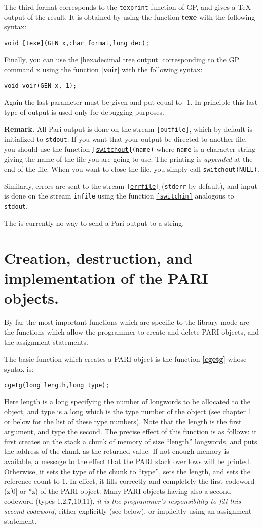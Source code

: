 The third format corresponds to the {\tt texprint} function of GP, and gives
a \TeX{} output of the result. It is obtained by using the function
{\bf texe} with the following syntax:

{\tt void \ref{texe}(GEN x,char format,long dec);}

Finally, you can use the \ref{hexadecimal tree output} corresponding to the GP
command \bs x using the function {\bf \ref{voir}} with the following syntax:

{\tt void voir(GEN x,-1);}

Again the last parameter must be given and put equal to -1. In principle this
last type of output is used only for debugging purposes.

{\bf Remark.} All Pari output is done on the stream {\tt \ref{outfile}}, which by
default is initialized to {\tt stdout}. If you want that your output be
directed to another file, you should use the function {\tt \ref{switchout}(name)}
where {\tt name} is a character string giving the name of the file you
are going to use. The printing is {\it appended\/} at the end of the file.
When you want to close the file, you simply call {\tt switchout(NULL)}.

Similarly, errors are sent to the stream {\tt \ref{errfile}} ({\tt stderr}
by default), and input is done on the stream {\tt infile} using the function 
{\tt \ref{switchin}} analogous to {\tt stdout}.

The is currently no way to send a Pari output to a string.

\section{Creation, destruction, and implementation of the PARI objects.}

By far the most important functions which are specific to the library mode
are the functions which allow the programmer to create and delete PARI objects,
and the assignment statements.

The basic function which creates a PARI object is the function
{\bf \ref{cgetg}} whose syntax is:

 {\tt cgetg(long length,long type);}

Here length is a long specifying the number of longwords to be allocated to
the object, and type is a long which is the type number of the object
(see chapter 1 or below for the list of these
type numbers). Note that the length is the first argument, and type the second.
The precise effect of this function is as follows: it first creates on the stack
a chunk of memory of size ``length'' longwords, and puts the address of the chunk
as the returned value.
If not enough memory is available, a message to the effect that the PARI stack
overflows will be printed. Otherwise, it sets the type of the chunk to ``type'',
sets the length, and sets the reference count to 1. In effect, it fills
correctly and completely the first codeword (z[0] or *z) of the PARI object.
Many PARI objects having also a second codeword (types 1,2,7,10,11),
{\it it is the programmer's responsibility to fill this second codeword\/},
either explicitly (see below), or implicitly using an assignment statement.

